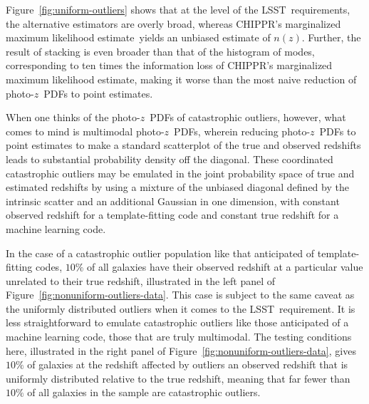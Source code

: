 \documentclass[iop]{emulateapj}
\newcommand{\Fig}[1]{Figure~\ref{#1}}
\newcommand{\project}[1]{{\textsc{#1}}}
\newcommand{\lsst}{\project{LSST}}
\newcommand{\Chippr}{\project{CHIPPR}}
\newcommand{\nz}{$n(z)$}
\newcommand{\pz}{photo-$z$~}
\newcommand{\pzpdf}{\pz PDF}
\newcommand{\mmle}{marginalized maximum likelihood estimate}
\begin{document}
\Fig{fig:uniform-outliers} shows that at the level of the \lsst\ requirements, the alternative estimators are overly broad, whereas \Chippr's \mmle\ yields an unbiased estimate of \nz.
Further, the result of stacking is even broader than that of the histogram of modes, corresponding to ten times the information loss of \Chippr's \mmle, making it worse than the most naive reduction of \pzpdf s to point estimates.

When one thinks of the \pzpdf s of catastrophic outliers, however, what comes to mind is multimodal \pzpdf s, wherein reducing \pzpdf s to point estimates to make a standard scatterplot of the true and observed redshifts leads to substantial probability density off the diagonal.
These coordinated catastrophic outliers may be emulated in the joint probability space of true and estimated redshifts by using a mixture of the unbiased diagonal defined by the intrinsic scatter and an additional Gaussian in one dimension, with constant observed redshift for a template-fitting code and constant true redshift for a machine learning code.

In the case of a catastrophic outlier population like that anticipated of template-fitting codes, $10\%$ of all galaxies have their observed redshift at a particular value unrelated to their true redshift, illustrated in the left panel of \Fig{fig:nonuniform-outliers-data}.
This case is subject to the same caveat as the uniformly distributed outliers when it comes to the \lsst\ requirement.
It is less straightforward to emulate catastrophic outliers like those anticipated of a machine learning code, those that are truly multimodal.
The testing conditions here, illustrated in the right panel of \Fig{fig:nonuniform-outliers-data}, gives $10\%$ of galaxies at the redshift affected by outliers an observed redshift that is uniformly distributed relative to the true redshift, meaning that far fewer than $10\%$ of all galaxies in the sample are catastrophic outliers.
\end{document}
